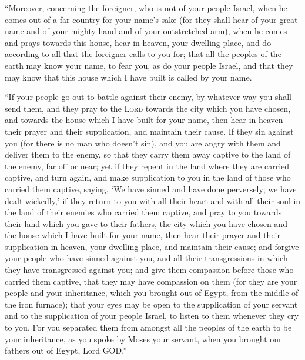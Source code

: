  ``Moreover, concerning the foreigner, who is not of your
people Israel, when he comes out of a far country for your name's sake
 (for they shall hear of your great name and of your
mighty hand and of your outstretched arm), when he comes and prays
towards this house,  hear in heaven, your dwelling place,
and do according to all that the foreigner calls to you for; that all
the peoples of the earth may know your name, to fear you, as do your
people Israel, and that they may know that this house which I have built
is called by your name.

 ``If your people go out to battle against their enemy,
by whatever way you shall send them, and they pray to the \textsc{Lord}
towards the city which you have chosen, and towards the house which I
have built for your name,  then hear in heaven their
prayer and their supplication, and maintain their cause. 
If they sin against you (for there is no man who doesn't sin), and you
are angry with them and deliver them to the enemy, so that they carry
them away captive to the land of the enemy, far off or near;
 yet if they repent in the land where they are carried
captive, and turn again, and make supplication to you in the land of
those who carried them captive, saying, `We have sinned and have done
perversely; we have dealt wickedly,'  if they return to
you with all their heart and with all their soul in the land of their
enemies who carried them captive, and pray to you towards their land
which you gave to their fathers, the city which you have chosen and the
house which I have built for your name,  then hear their
prayer and their supplication in heaven, your dwelling place, and
maintain their cause;  and forgive your people who have
sinned against you, and all their transgressions in which they have
transgressed against you; and give them compassion before those who
carried them captive, that they may have compassion on them
 (for they are your people and your inheritance, which
you brought out of Egypt, from the middle of the iron furnace);
 that your eyes may be open to the supplication of your
servant and to the supplication of your people Israel, to listen to them
whenever they cry to you.  For you separated them from
amongst all the peoples of the earth to be your inheritance, as you
spoke by Moses your servant, when you brought our fathers out of Egypt,
Lord GOD.''

